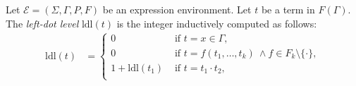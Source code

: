 \documentclass[a4paper]{llncs}
\begin{document}
  \begin{definition}
    Let $\mathcal{E}=(\Sigma,\Gamma,P,F)$ be an expression environment. Let $t$ be a term in $F(\Gamma)$. The \emph{left-dot level} $\mathrm{ldl}(t)$ is the integer inductively computed as follows: 
        \begin{align*}
        \mathrm{ldl}(t)&=
        \begin{cases}
            0 & \text{ if }t=x\in\Gamma,\\
            0 & \text{ if } t=f(t_1,\ldots,t_k)\ \wedge f\in F_k\setminus\{\cdot\},\\
            1+\mathrm{ldl}(t_1) & \text{ if } t=t_1\cdot t_2,\\
          \end{cases}
        \end{align*}
  \end{definition}
  
\end{document}
